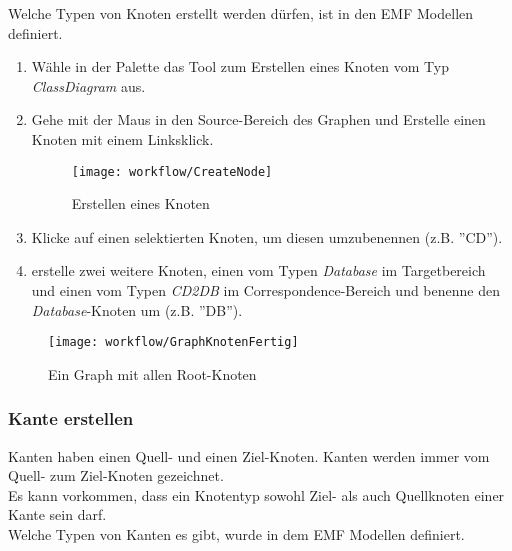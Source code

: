 			Welche Typen von Knoten erstellt werden dürfen, ist in den EMF Modellen definiert.			
			
			\begin{enumerate}			
				\item Wähle in der Palette das Tool zum Erstellen eines Knoten vom Typ \textit{ClassDiagram} aus.
				
				\item Gehe mit der Maus in den Source-Bereich des Graphen und Erstelle einen Knoten mit einem Linksklick.

			\begin{figure}[h!]%
				\centering
				\texttt{[image: workflow/CreateNode]}
				\caption{Erstellen eines Knoten}
				\label{fig:createNode}
			\end{figure}


				\item Klicke auf einen selektierten Knoten, um diesen umzubenennen (z.B. ''CD'').
				
				\item erstelle zwei weitere Knoten, einen vom Typen \textit{Database} im Targetbereich und einen vom Typen \textit{CD2DB} im Correspondence-Bereich und benenne den \textit{Database}-Knoten um (z.B. ''DB'').
			\end{enumerate}
						
			\begin{figure}[h!]%
				\centering
				\texttt{[image: workflow/GraphKnotenFertig]}
				\caption{Ein Graph mit allen Root-Knoten}
				\label{fig:graphKnotenFertig}
			\end{figure}						
						
			\subsubsection{Kante erstellen}			

			Kanten haben einen Quell- und einen Ziel-Knoten. Kanten werden immer vom Quell- zum Ziel-Knoten gezeichnet.\\
			Es kann vorkommen, dass ein Knotentyp sowohl Ziel- als auch Quellknoten einer Kante sein darf.\\
			Welche Typen von Kanten es gibt, wurde in dem EMF Modellen definiert. 
			
